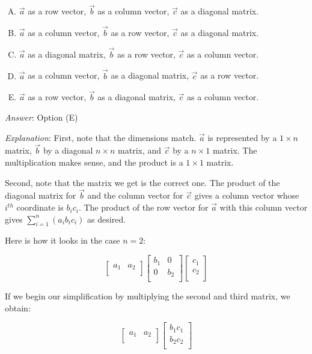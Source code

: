 \documentclass[10pt]{amsart}
\begin{document}
\begin{enumerate}
  \begin{enumerate}[(A)]
  \item $\vec{a}$ as a row vector, $\vec{b}$ as a column vector,
    $\vec{c}$ as a diagonal matrix.
  \item $\vec{a}$ as a column vector, $\vec{b}$ as a row vector,
    $\vec{c}$ as a diagonal matrix.
  \item $\vec{a}$ as a diagonal matrix, $\vec{b}$ as a row vector,
    $\vec{c}$ as a column vector.
  \item $\vec{a}$ as a column vector, $\vec{b}$ as a diagonal matrix,
    $\vec{c}$ as a row vector.
  \item $\vec{a}$ as a row vector, $\vec{b}$ as a diagonal matrix,
    $\vec{c}$ as a column vector.
  \end{enumerate}

  {\em Answer}: Option (E)

  {\em Explanation}: First, note that the dimensions match. $\vec{a}$
  is represented by a $1 \times n$ matrix, $\vec{b}$ by a diagonal $n
  \times n$ matrix, and $\vec{c}$ by a $n \times 1$ matrix. The
  multiplication makes sense, and the product is a $1 \times 1$
  matrix.
 
  Second, note that the matrix we get is the correct one. The product
  of the diagonal matrix for $\vec{b}$ and the column vector for
  $\vec{c}$ gives a column vector whose $i^{th}$ coordinate is
  $b_ic_i$. The product of the row vector for $\vec{a}$ with this
  column vector gives $\sum_{i=1}^n (a_ib_ic_i)$ as desired.

  Here is how it looks in the case $n = 2$:

  $$\left[\begin{matrix} a_1 & a_2 \\\end{matrix}\right] \left[\begin{matrix} b_1 & 0 \\ 0 & b_2 \\\end{matrix}\right] \left[\begin{matrix} c_1 \\ c_2 \\\end{matrix}\right]$$

  If we begin our simplification by multiplying the second and third matrix, we obtain:

  $$\left[\begin{matrix} a_1 & a_2 \\\end{matrix}\right] \left[\begin{matrix} b_1c_1 \\ b_2c_2 \\\end{matrix}\right]$$


\end{enumerate}
\end{document}
